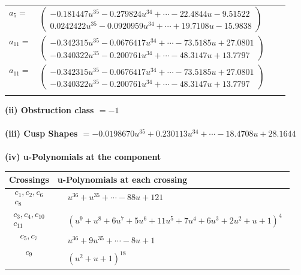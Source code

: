 \documentclass[1p]{elsarticle_modified}
\theoremstyle{definition}
\begin{document}
\begin{tabular}{m{7pt} m{180pt} m{7pt} m{180pt} }
\flushright $a_{5}=$&$\begin{pmatrix}-0.181447 u^{35}-0.279824 u^{34}+\cdots-22.4844 u-9.51522\\0.0242422 u^{35}-0.0920959 u^{34}+\cdots+19.7108 u-15.9838\end{pmatrix}$ \\
\flushright $a_{11}=$&$\begin{pmatrix}-0.342315 u^{35}-0.0676417 u^{34}+\cdots-73.5185 u+27.0801\\-0.340322 u^{35}-0.200761 u^{34}+\cdots-48.3147 u+13.7797\end{pmatrix}$\\ \flushright $a_{11}=$&$\begin{pmatrix}-0.342315 u^{35}-0.0676417 u^{34}+\cdots-73.5185 u+27.0801\\-0.340322 u^{35}-0.200761 u^{34}+\cdots-48.3147 u+13.7797\end{pmatrix}$\\&\end{tabular}
\flushleft \textbf{(ii) Obstruction class $= -1$}\\~\\
\flushleft \textbf{(iii) Cusp Shapes $= -0.0198670 u^{35}+0.230113 u^{34}+\cdots-18.4708 u+28.1644$}\\~\\
\newpage\renewcommand{\arraystretch}{1}
\flushleft \textbf{(iv) u-Polynomials at the component}\newline \\
\begin{tabular}{m{50pt}|m{274pt}}
Crossings & \hspace{64pt}u-Polynomials at each crossing \\
\hline $$\begin{aligned}c_{1},c_{2},c_{6}\\c_{8}\end{aligned}$$&$\begin{aligned}
&u^{36}+u^{35}+\cdots-88 u+121
\end{aligned}$\\
\hline $$\begin{aligned}c_{3},c_{4},c_{10}\\c_{11}\end{aligned}$$&$\begin{aligned}
&(u^9+u^8+6 u^7+5 u^6+11 u^5+7 u^4+6 u^3+2 u^2+u+1)^4
\end{aligned}$\\
\hline $$\begin{aligned}c_{5},c_{7}\end{aligned}$$&$\begin{aligned}
&u^{36}+9 u^{35}+\cdots-8 u+1
\end{aligned}$\\
\hline $$\begin{aligned}c_{9}\end{aligned}$$&$\begin{aligned}
&(u^2+u+1)^{18}
\end{aligned}$\\
\hline
\end{tabular}\\~\\
\end{document}
